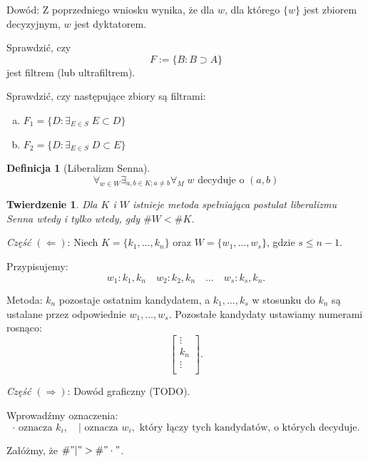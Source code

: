 \documentclass[12pt,a4paper]{article}
\theoremstyle{break}
\newtheorem{definition}{Definicja}[section]
\newtheorem{theorem}{Twierdzenie}[section]
\begin{document}
	Dowód: Z poprzedniego wniosku wynika, że dla $w$, dla którego $\{w\}$ jest zbiorem decyzyjnym, $w$ jest dyktatorem.
	\begin{zad}
		Sprawdzić, czy 
		\[
		F := \{B : B \supset A\}
		\]
		jest filtrem (lub ultrafiltrem).
	\end{zad}
	
	\begin{zad}
		Sprawdzić, czy następujące zbiory są filtrami:
		\begin{enumerate}[a)]
			\item $F_1 = \{D : \exists_{E \in S} \; E \subset D\}$
			\item $F_2 = \{D : \exists_{E \in S} \; D \subset E\}$
		\end{enumerate}
	\end{zad}
	
	\begin{definition}[Liberalizm Senna]
		\[
		\forall_{w \in W} \exists_{a, b \in K; a \neq b} \forall_M \; w \text{ decyduje o } (a, b)
		\]
	\end{definition}
	
	\begin{theorem}
		Dla $K$ i $W$ istnieje metoda spełniająca postulat liberalizmu Senna \textit{wtedy i tylko wtedy}, gdy $\# W < \# K$.
	\end{theorem}
	
	\textit{Część $(\Leftarrow)$}: Niech $K = \{k_1, \dots, k_n\}$ oraz $W = \{w_1, \dots, w_s\}$, gdzie $s \leq n - 1$. 
		
		Przypisujemy:
		\[
		w_1 : k_1, k_n \quad w_2 : k_2, k_n \quad \dots \quad w_s : k_s, k_n.
		\]
		
		Metoda: $k_n$ pozostaje ostatnim kandydatem, a $k_1, \dots, k_s$ w stosunku do $k_n$ są ustalane przez odpowiednie $w_1, \dots, w_s$. Pozostałe kandydaty ustawiamy numerami rosnąco:
		\[
		\begin{bmatrix}
			\vdots \\
			k_n \\
			\vdots \\
		\end{bmatrix}.
		\]
		
		\textit{Część $(\Rightarrow)$}: Dowód graficzny (TODO).
		
		Wprowadźmy oznaczenia:
		\[
		\cdot \text{ oznacza } k_i, \quad | \text{ oznacza } w_i, \text{ który łączy tych kandydatów, o których decyduje}.
		\]
		
		Załóżmy, że $\# "|" > \# "\cdot"$.
		
\end{document}

